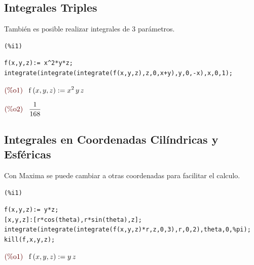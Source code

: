 \documentclass[12pt]{article}
\begin{document}
\subsection{Integrales Triples}
También es posible realizar integrales de 3 parámetros.

\noindent
\begin{minipage}[t]{8ex}{\color{red}\bf
\begin{verbatim}
(%i1) 
\end{verbatim}}
\end{minipage}
\begin{minipage}[t]{\textwidth}{\color{blue}
\begin{verbatim}
f(x,y,z):= x^2*y*z;
integrate(integrate(integrate(f(x,y,z),z,0,x+y),y,0,-x),x,0,1);
\end{verbatim}}
\end{minipage}
\begin{math}\displaystyle
\parbox{8ex}{\color{labelcolor}(\%o1) }
\mathrm{f}\left( x,y,z\right) :={x}^{2}\,y\,z
\end{math}

\begin{math}\displaystyle
\parbox{8ex}{\color{labelcolor}(\%o2) }
\frac{1}{168}
\end{math}

\subsection{Integrales en Coordenadas Cilíndricas y Esféricas}
Con Maxima se puede cambiar a otras coordenadas para facilitar el calculo.

\noindent
\begin{minipage}[t]{8ex}{\color{red}\bf
\begin{verbatim}
(%i1) 
\end{verbatim}}
\end{minipage}
\begin{minipage}[t]{\textwidth}{\color{blue}
\begin{verbatim}
f(x,y,z):= y*z;
[x,y,z]:[r*cos(theta),r*sin(theta),z];
integrate(integrate(integrate(f(x,y,z)*r,z,0,3),r,0,2),theta,0,%pi);
kill(f,x,y,z);
\end{verbatim}}
\end{minipage}
\begin{math}\displaystyle
\parbox{8ex}{\color{labelcolor}(\%o1) }
\mathrm{f}\left( x,y,z\right) :=y\,z
\end{math}
\end{document}
